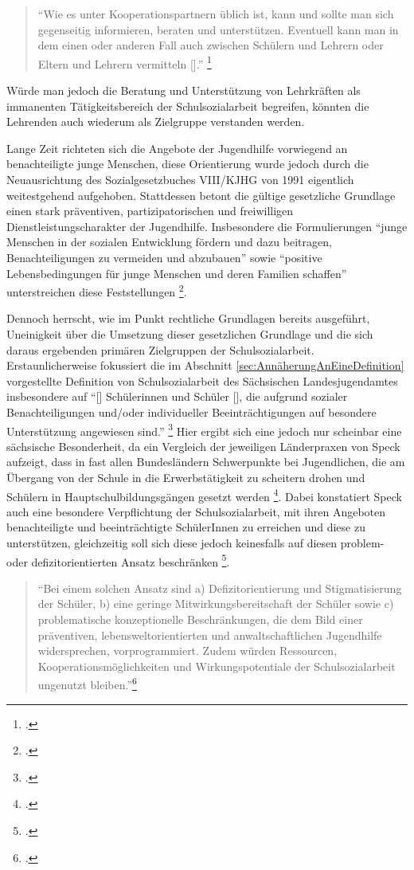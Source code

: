 \begin{quotation}
\noindent
"`Wie es unter Kooperationspartnern üblich ist, kann und sollte man sich gegenseitig informieren, beraten und unterstützen. Eventuell kann man in dem einen oder anderen Fall auch zwischen Schülern und Lehrern oder Eltern und Lehrern vermitteln [\punkte]."' \footcite[vgl.][50]{Spies2011}
\end{quotation}

Würde man jedoch die Beratung und Unterstützung von Lehrkräften als immanenten Tätigkeitsbereich der Schulsozialarbeit begreifen, könnten die Lehrenden auch wiederum als Zielgruppe verstanden werden.

Lange Zeit richteten sich die Angebote der Jugendhilfe vorwiegend an benachteiligte junge Menschen, diese Orientierung wurde jedoch durch die Neuausrichtung des Sozialgesetzbuches VIII/KJHG von 1991 eigentlich weitestgehend aufgehoben. Stattdessen betont die gültige gesetzliche Grundlage einen stark präventiven, partizipatorischen und freiwilligen Dienstleistungscharakter der Jugendhilfe. Insbesondere die Formulierungen "`junge Menschen in der sozialen Entwicklung fördern und dazu beitragen, Benachteiligungen zu vermeiden und abzubauen"' sowie "`positive Lebensbedingungen für junge Menschen und deren Familien schaffen"' unterstreichen diese Feststellungen \footcites[vgl.][30f]{Speck2007}[vgl.][46]{Spies2011}. 

Dennoch herrscht, wie im Punkt rechtliche Grundlagen bereits ausgeführt, Uneinigkeit über die Umsetzung dieser gesetzlichen Grundlage und die sich daraus ergebenden primären Zielgruppen der Schulsozialarbeit. Erstaunlicherweise fokussiert die im Abschnitt \ref{sec:AnnäherungAnEineDefinition} vorgestellte Definition von Schulsozialarbeit des Sächsischen Landesjugendamtes insbesondere auf "`[\punkte] Schülerinnen und Schüler [\punkte], die aufgrund sozialer Benachteiligungen und/oder individueller Beeinträchtigungen auf besondere Unterstützung angewiesen sind."' \footcite[10]{SMSSSL2008} Hier ergibt sich eine jedoch nur scheinbar eine sächsische Besonderheit, da ein Vergleich der jeweiligen Länderpraxen von Speck aufzeigt, dass in fast allen Bundesländern Schwerpunkte bei Jugendlichen, die am Übergang von der Schule in die Erwerbstätigkeit zu scheitern drohen und Schülern in Hauptschulbildungsgängen gesetzt werden \footcite[vgl.][19ff]{Speck2007}. Dabei konstatiert Speck auch eine besondere Verpflichtung der Schulsozialarbeit, mit ihren Angeboten benachteiligte und beeinträchtigte SchülerInnen zu erreichen und diese zu unterstützen, gleichzeitig soll sich diese jedoch keinesfalls auf diesen problem- oder defizitorientierten Ansatz beschränken \footcite[vgl.][46]{Speck2007}. 
\begin{quotation}
\noindent
"`Bei einem solchen Ansatz sind a) Defizitorientierung und Stigmatisierung der Schüler, b) eine geringe Mitwirkungsbereitschaft der Schüler sowie c) problematische konzeptionelle Beschränkungen, die dem Bild einer präventiven, lebensweltorientierten und anwaltschaftlichen Jugendhilfe widersprechen, vorprogrammiert. Zudem würden Ressourcen, Kooperationsmöglichkeiten und Wirkungspotentiale der Schulsozialarbeit ungenutzt bleiben."'\footcite[vgl.][46]{Speck2007}
\end{quotation}
 
